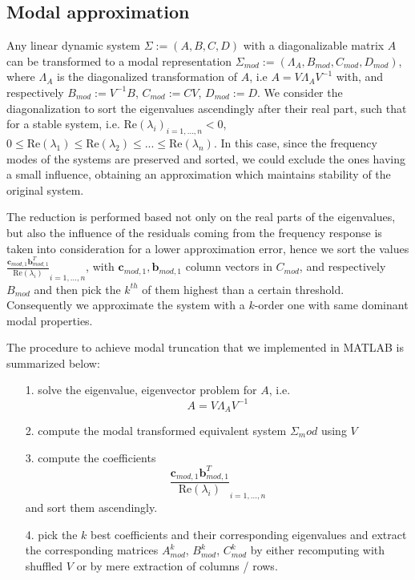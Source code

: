 \documentclass[10pt,a4paper]{article}
\begin{document}
\subsection{Modal approximation}
Any linear dynamic system $\Sigma := (A,B,C,D)$ with a diagonalizable matrix $A$ can be transformed to a modal representation $\Sigma_{mod}:=(\Lambda_A,B_{mod},C_{mod},D_{mod})$, where $\Lambda_A$ is the diagonalized transformation of $A$, i.e $A = V\Lambda_AV^{-1}$ with, and respectively $B_{mod} := V^{-1}B$, $C_{mod} := CV$, $D_{mod} := D$. We consider the diagonalization to sort the eigenvalues ascendingly after their real part, such that for a stable system, i.e. $\text{Re}(\lambda_i )_{i=1,...,n}<0$, $0 \leq \text{Re}(\lambda_1)  \leq \text{Re}(\lambda_2) \leq ... \leq \text{Re}(\lambda_n)$. In this case, since the frequency modes of the systems are preserved and sorted, we could exclude the ones having a small influence, obtaining an approximation which maintains stability of the original system.

The reduction is performed based not only on the real parts of the eigenvalues, but also the influence of the residuals coming from the frequency response is taken into consideration for a lower approximation error, hence we sort the values $\frac{\textbf{c}_{mod,1}\textbf{b}_{mod,1}^T}{\text{Re}(\lambda_i)}_{i=1,...,n}$, with $\textbf{c}_{mod,1}, \textbf{b}_{mod,1}$ column vectors in $C_{mod}$,  and respectively $B_{mod}$ and then pick the $k^{th}$ of them highest than a certain threshold. Consequently we approximate the system with a $k$-order one with same dominant modal properties.

The procedure to achieve modal truncation that we implemented in MATLAB is summarized below:
\begin{itemize}
\item [1.] solve the eigenvalue, eigenvector problem for $A$, i.e. $$ A = V\Lambda_AV^{-1}$$
\item [2.] compute the modal transformed equivalent system $\Sigma_mod$ using $V$
\item [3.] compute the coefficients $$\frac{\textbf{c}_{mod,1}\textbf{b}_{mod,1}^T}{\text{Re}(\lambda_i)}_{i=1,...,n}$$ and sort them ascendingly.
\item [4.] pick the $k$ best coefficients and their corresponding eigenvalues and extract the corresponding matrices $A_{mod}^k$, $B_{mod}^k$, $C_{mod}^k$ by either recomputing with shuffled $V$ or by mere extraction of columns / rows.
\end{itemize}
\end{document}
